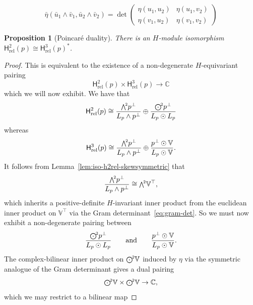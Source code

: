 \documentclass[10pt,a4paper]{amsart}
\newtheorem{proposition}{Proposition}
\newcommand{\CC}{\mathbb{C}}
\newcommand{\Hrel}{\mathsf{H}_{\mathrm{rel}}}
\newcommand{\VV}{\mathbb{V}}
\newcommand\ext[1]{\scalebox{.85}{$\bigwedge^{\!#1}$}}
\newcommand\sym[1]{\scalebox{.85}{$\bigodot^{\!#1}$}}
\begin{document}
\begin{equation}
  \label{eq:gram-det}
  \bar\eta(\bar u_1 \wedge \bar v_1, \bar u_2 \wedge \bar v_2) =
  \det
  \begin{pmatrix}
    \eta(u_1,u_2) & \eta(u_1,v_2) \\
    \eta(v_1,u_2) & \eta(v_1,v_2)
  \end{pmatrix}
\end{equation}

\begin{proposition}[Poincaré duality]
  \label{prop:poincare-duality}
  There is an $H$-module isomorphism $\Hrel^2(p) \cong \Hrel^3(p)^*$.
\end{proposition}

\begin{proof}
  This is equivalent to the existence of a non-degenerate
  $H$-equivariant pairing
  \begin{equation}
    \Hrel^2(p) \times \Hrel^3(p) \to \CC
  \end{equation}
  which we will now exhibit.  We have that
  \begin{equation}
    \Hrel^2(p) \cong \dfrac{\ext{2} p^\perp}{L_p \wedge p^\perp} \oplus \dfrac{\sym{2} p^\perp}{L_p \odot L_p}
  \end{equation}
  whereas
  \begin{equation}
    \Hrel^3(p) \cong \dfrac{\ext{2} p^\perp}{L_p \wedge p^\perp} \oplus \dfrac{p^\perp \odot \VV}{L_p \odot \VV}.
  \end{equation}
  It follows from Lemma~\ref{lem:iso-h2rel-skewsymmetric} that
  \begin{equation}
    \dfrac{\ext{2}p^\perp}{L_p \wedge p^\perp} \cong \ext{2} \VV^\top,
  \end{equation}
  which inherits a positive-definite $H$-invariant inner product from
  the euclidean inner product on $\VV^\top$ via the Gram
  determinant~\eqref{eq:gram-det}.  So we must now exhibit a
  non-degenerate pairing between
  \begin{equation}
     \dfrac{\sym{2} p^\perp}{L_p \odot L_p} \qquad\text{and}\qquad
     \dfrac{p^\perp \odot \VV}{L_p \odot \VV}.
  \end{equation}
  The complex-bilinear inner product on $\sym{2}\VV$ induced by $\eta$
  via the symmetric analogue of the Gram determinant gives a dual
  pairing
  \begin{equation}
    \sym{2}\VV \times \sym{2}\VV \to \CC,
  \end{equation}
  which we may restrict to a bilinear map

\end{proof}
\end{document}
